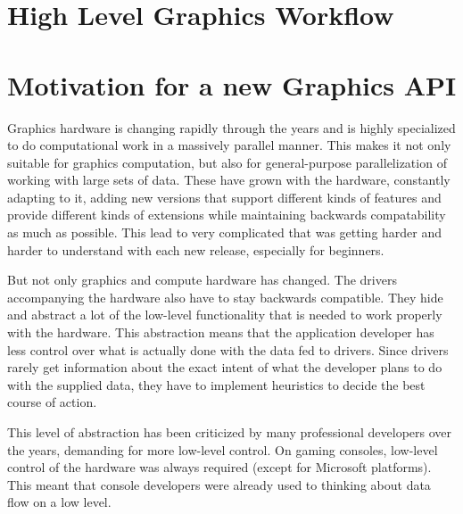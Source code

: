   \section{High Level Graphics Workflow}
    \label{sec:GraphicsWorkflow}

    \tbd


  \section{Motivation for a new Graphics API}

    Graphics hardware is changing rapidly through the years and is highly specialized to do computational work in a massively parallel manner. This makes it not only suitable for graphics computation, but also for general-purpose parallelization of working with large sets of data. These  have grown with the hardware, constantly adapting to it, adding new versions that support different kinds of features and provide different kinds of extensions while maintaining backwards compatability as much as possible. This lead to very complicated  that was getting harder and harder to understand with each new release, especially for beginners.

    But not only graphics and compute hardware has changed. The drivers accompanying the hardware also have to stay backwards compatible. They hide and abstract a lot of the low-level functionality that is needed to work properly with the hardware. This abstraction means that the application developer has less control over what is actually done with the data fed to drivers. Since drivers rarely get information about the exact intent of what the developer plans to do with the supplied data, they have to implement heuristics to decide the best course of action.

    This level of abstraction has been criticized by many professional developers over the years, demanding for more low-level control. On gaming consoles, low-level control of the hardware was always required (except for Microsoft platforms). This meant that console developers were already used to thinking about data flow on a low level.

